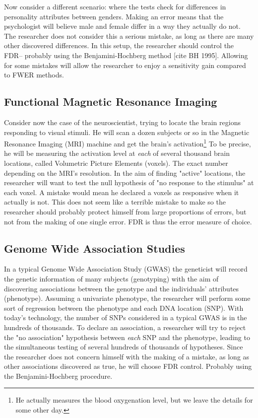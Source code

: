 \documentclass[draft,12pt]{article}
\begin{document}
Now consider a different scenario: where the tests check for differences in personality attributes between genders. Making an error means that the psychologist will believe male and female differ in a way they actually do not. The researcher does not consider this a serious mistake, as long as there are many other discovered differences. In this setup, the researcher should control the FDR-- probably using the Benjamini-Hochberg method [cite BH 1995]. Allowing for some mistakes will allow the researcher to enjoy a sensitivity gain compared to FWER methods.


\subsection{Functional Magnetic Resonance Imaging}
Consider now the case of the neuroscientist, trying to locate the brain regions responding to visual stimuli. He will scan a dozen subjects or so in the Magnetic Resonance Imaging (MRI) machine and get the brain's activation\footnote{ He actually measures the blood oxygenation level, but we leave the details for some other day.} To be precise, he will be measuring the activation level at \emph{each} of several thousand brain locations, called Volumetric Picture Elements (voxels). The exact number depending on the MRI's resolution. 
In the aim of finding "active" locations, the researcher will want to test the null hypothesis of "no response to the stimulus" at each voxel. A mistake would mean he declared a voxels as responsive when it actually is not. This does not seem like a terrible mistake to make so the researcher should probably protect himself from large proportions of errors, but not from the making of one single error. FDR is thus the error measure of choice.



\subsection{Genome Wide Association Studies}
In a typical Genome Wide Association Study (GWAS) the geneticist will record the genetic information of many subjects (genotyping) with the aim of discovering associations between the genotype and the individuals' attributes (phenotype). Assuming a univariate phenotype, the researcher will perform some sort of regression between the phenotype and each DNA location (SNP). With today’s technology, the number of SNPs considered in a typical GWAS is in the hundreds of thousands. To declare an association, a researcher will try to reject the "no association" hypothesis between \emph{each} SNP and the phenotype, leading to the simultaneous testing of several hundreds of thousands of hypotheses. Since the researcher does not concern himself with the making of a mistake, as long as other associations discovered as true, he will choose FDR control. Probably using the Benjamini-Hochberg procedure.
\end{document}
